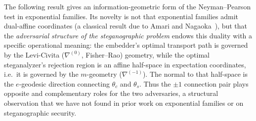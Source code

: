 \documentclass[a4paper,fleqn]{cas-dc}
\begin{document}
The following result gives an information-geometric form of the
Neyman--Pearson test in exponential families.
Its novelty is not that exponential families admit dual-affine coordinates
(a classical result due to Amari and Nagaoka~\cite{amari2000methods}), but
that the \emph{adversarial structure of the steganographic problem} endows
this duality with a specific operational meaning: the embedder's optimal
transport path is governed by the Levi-Civita ($\nabla^{(0)}$, Fisher--Rao)
geometry, while the optimal steganalyzer's rejection region is an affine
half-space in expectation coordinates, i.e.\ it is governed by the
$m$-geometry ($\nabla^{(-1)}$).
The normal to that half-space is the $e$-geodesic direction connecting
$\theta_c$ and $\theta_s$.
Thus the $\pm 1$ connection pair plays opposite and complementary roles for
the two adversaries, a structural observation that we have not found in prior
work on exponential families or on steganographic security.
\end{document}
